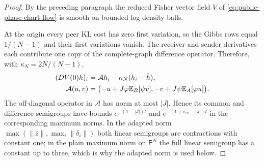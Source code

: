 \begin{proof}
By the preceding paragraph the reduced Fisher vector field $V$ of \cref{eq:public-phase-chart-flow} is smooth on bounded log-density balls.

At the origin every peer KL cost has zero first variation, so the Gibbs rows equal $1/(N-1)$ and their first variations vanish. The receiver and sender derivatives each contribute one copy of the complete-graph difference operator. Therefore, with $\kappa_N=2N/(N-1)$,
\begin{equation}
 \begin{aligned}
 (DV(0)h)_i&=\mathcal Ah_i-\kappa_N(h_i-\bar h),\\
 \mathcal A(u,v)&=\bigl(-u+J\varphi\mathbb E_B[\psi v],
                         -v+J\psi\mathbb E_A[\varphi u]\bigr).
 \end{aligned}
 \label{eq:public-phase-linearization}
\end{equation}
The off-diagonal operator in $\mathcal A$ has norm at most $|J|$. Hence its common and difference semigroups have bounds $e^{-(1-|J|)t}$ and $e^{-(1+\kappa_N-|J|)t}$ in the corresponding maximum norms. In the adapted norm $\max(\|\bar z\|,\max_i\|\delta_i\|)$ both linear semigroups are contractions with constant one; in the plain maximum norm on $\mathsf E^N$ the full linear semigroup has a constant up to three, which is why the adapted norm is used below.


\end{proof}
